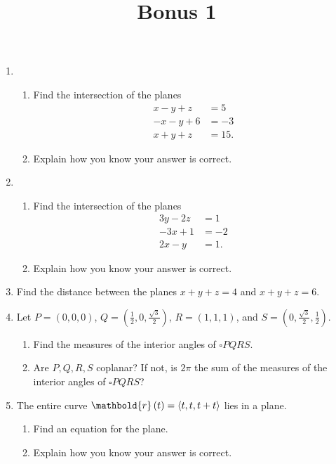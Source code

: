 \documentclass[12pt]{article}
\title{Bonus 1}
\author{}\date{}
\let\sin\relax\DeclareMathOperator{\sin}{\mathsf{sin}}
\let\cos\relax\DeclareMathOperator{\cos}{\mathsf{cos}}
\begin{document}
\maketitle
\thispagestyle{empty}

\begin{enumerate}

\item
\begin{enumerate}
\item Find the intersection of the planes
\begin{align*}
x-y+z&=5\\
-x-y+6&=-3\\
x+y+z&=15.
\end{align*}
\item Explain how you know your answer is correct.
\end{enumerate}

\item
\begin{enumerate}
\item Find the intersection of the planes
\begin{align*}
3y-2z&=1\\
-3x+1&=-2\\
2x-y&=1.
\end{align*}
\item Explain how you know your answer is correct.
\end{enumerate}

\item Find the distance between the planes
$x+y+z=4$ and $x+y+z=6$.

\item Let $P=\left(0,0,0\right)$,
$Q=\left(\frac{1}{2},0,\frac{\sqrt{3}}{2}\right)$,
$R=\left(1,1,1\right)$, and
$S=\left(0,\frac{\sqrt{3}}{2},\frac{1}{2}\right)$.
\begin{enumerate}
\item Find the measures of the interior angles
of $\square PQRS$.
\item Are $P,Q,R,S$ coplanar? If not, is $2\pi$ the
sum of the measures of the interior angles of
$\square PQRS$?
\end{enumerate}

\item
The entire curve $\mathbold{r}\left(t\right)
=\left\langle\cos{t},\sin{t},\cos{t}+\sin{t}\right\rangle$
lies in a plane.
\begin{enumerate}
\item Find an equation for the plane.
\item Explain how you know your answer is correct.
\end{enumerate}
\end{enumerate}
\end{document}
